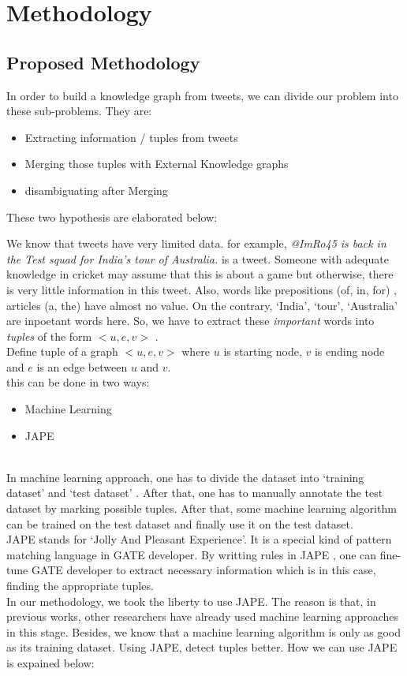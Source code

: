 \chapter{Methodology}\label{ch4}

\section{Proposed Methodology}
In order to build a knowledge graph from tweets, we can divide our problem into these sub-problems. They are:
\begin{itemize}
\item Extracting information / tuples from tweets 
\item Merging those tuples with External Knowledge graphs
\item disambiguating after Merging 
\end{itemize} 
These two hypothesis are elaborated below: 

We know that tweets have very limited data. for example, 
\textit{ @ImRo45 is back in the Test squad for India’s tour of Australia. } is a tweet. Someone with adequate knowledge in cricket
may assume that this is about a game but otherwise, there is very little information in this tweet. 
Also, words like prepositions (of, in, for) , articles (a, the) have almost no value. On the contrary, `India', `tour', `Australia' 
are inpoetant words here. 
So, we have to extract these \textit{ important } words into \textit{ tuples } of the form $<u, e, v>$ . \\
 Define tuple of a graph $<u, e, v>$ where $ u $ is starting node, $ v $ is ending node and $ e $ is an edge between $ u $ and $v $. \\

this can be done in two ways: 
\begin{itemize}
\item Machine Learning 
\item JAPE 
\end{itemize} 
\\
In machine learning approach, one has to divide the dataset into `training dataset'  and `test dataset' . 
After that, one has to manually annotate the test dataset by marking possible tuples. After that, some machine learning algorithm
 can be trained on the test dataset and finally use it on the test dataset. 
\\ 
JAPE stands for `Jolly And Pleasant Experience'. It is a special kind of pattern matching language in GATE developer. 
By writting rules in JAPE , one can fine-tune GATE developer to extract necessary information which is in this case, 
finding the appropriate tuples. 
\\ 
In our methodology, we took the liberty to use JAPE. The reason is that, in previous works, other researchers  
 have already used machine learning approaches in this stage. Besides, we know 
that a machine learning algorithm is only as good as its training dataset. Using JAPE, detect tuples 
better. How we can use JAPE is expained below: 



